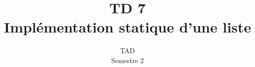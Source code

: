 \documentclass{article}
\title{TD 7\\ Implémentation statique d'une liste}
\date{TAD\\ Semestre 2}
\begin{document}
	\maketitle
	\section{}
		
	\section{}
		
		
\end{document}
